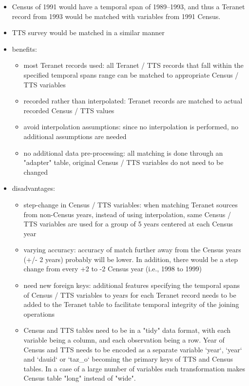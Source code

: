 \begin{enumerate}
\begin{itemize}
        \item Census of 1991 would have a temporal span of 1989--1993, and thus a Teranet record from 1993 would be matched with variables from 1991 Census.
        \item TTS survey would be matched in a similar manner
        \item benefits:
        \begin{itemize}
            \item most Teranet records used: all Teranet / TTS records that fall within the specified temporal spans range can be matched to appropriate Census / TTS variables
            \item recorded rather than interpolated: Teranet records are matched to actual recorded Census / TTS values
            \item avoid interpolation assumptions: since no interpolation is performed, no additional assumptions are needed
            \item no additional data pre-processing: all matching is done through an "adapter" table, original Census / TTS variables do not need to be changed
        \end{itemize}
        \item disadvantages:
        \begin{itemize}
            \item step-change in Census / TTS variables: when matching Teranet sources from non-Census years, instead of using interpolation, same Census / TTS variables are used for a group of 5 years centered at each Census year
            \item varying accuracy: accuracy of match further away from the Census years (+/- 2 years) probably will be lower.
            In addition, there would be a step change from every +2 to -2 Census year (i.e., 1998 to 1999)
            \item need new foreign keys: additional features specifying the temporal spans of Census / TTS variables to years for each Teranet record needs to be added to the Teranet table to facilitate temporal integrity of the joining operations
            \item Census and TTS tables need to be in a "tidy" data format, with each variable being a column, and each observation being a row.
            Year of Census and TTS needs to be encoded as a separate variable `year`, `year` and `dauid` or `taz_o` becoming the primary keys of TTS and Census tables.
            In a case of a large number of variables such transformation makes Census table "long" instead of "wide".
        \end{itemize}
    \end{itemize}
\end{enumerate}


